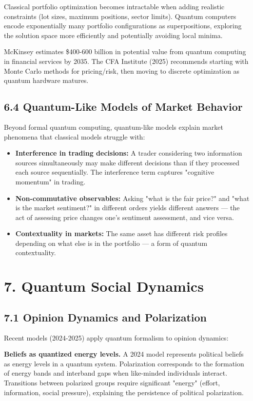 \documentclass[11pt]{article}
\begin{document}
Classical portfolio optimization becomes intractable when adding realistic
constraints (lot sizes, maximum positions, sector limits). Quantum computers
encode exponentially many portfolio configurations as superpositions, exploring
the solution space more efficiently and potentially avoiding local minima.

McKinsey estimates \$400-600 billion in potential value from quantum computing in
financial services by 2035. The CFA Institute (2025) recommends starting with
Monte Carlo methods for pricing/risk, then moving to discrete optimization as
quantum hardware matures.
\subsection{6.4 Quantum-Like Models of Market Behavior}
\label{sec:org97a8c1b}

Beyond formal quantum computing, quantum-like models explain market phenomena
that classical models struggle with:

\begin{itemize}
\item \textbf{Interference in trading decisions:} A trader considering two information sources
simultaneously may make different decisions than if they processed each source
sequentially. The interference term captures "cognitive momentum" in trading.
\item \textbf{Non-commutative observables:} Asking "what is the fair price?" and "what is the
market sentiment?" in different orders yields different answers --- the act of
assessing price changes one's sentiment assessment, and vice versa.
\item \textbf{Contextuality in markets:} The same asset has different risk profiles depending
on what else is in the portfolio --- a form of quantum contextuality.
\end{itemize}
\section{7. Quantum Social Dynamics}
\label{sec:org2e4f451}

\subsection{7.1 Opinion Dynamics and Polarization}
\label{sec:orgbb460df}

Recent models (2024-2025) apply quantum formalism to opinion dynamics:

\textbf{Beliefs as quantized energy levels.} A 2024 model represents political beliefs
as energy levels in a quantum system. Polarization corresponds to the formation
of energy bands and interband gaps when like-minded individuals interact.
Transitions between polarized groups require significant "energy" (effort,
information, social pressure), explaining the persistence of political
polarization.
\end{document}
